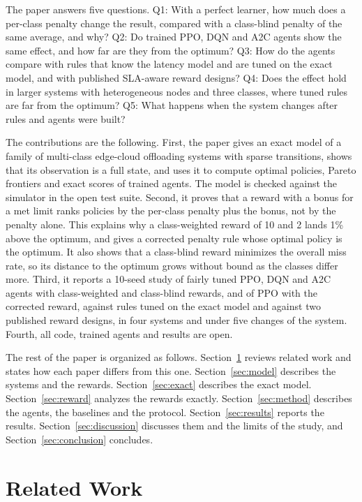 The paper answers five questions.
Q1: With a perfect learner, how much does a per-class penalty change the result, compared with a class-blind penalty of the same average, and why?
Q2: Do trained PPO, DQN and A2C agents show the same effect, and how far are they from the optimum?
Q3: How do the agents compare with rules that know the latency model and are tuned on the exact model, and with published SLA-aware reward designs?
Q4: Does the effect hold in larger systems with heterogeneous nodes and three classes, where tuned rules are far from the optimum?
Q5: What happens when the system changes after rules and agents were built?

The contributions are the following. First, the paper gives an exact model of a family of multi-class edge-cloud offloading systems with sparse transitions, shows that its observation is a full state, and uses it to compute optimal policies, Pareto frontiers and exact scores of trained agents. The model is checked against the simulator in the open test suite. Second, it proves that a reward with a bonus for a met limit ranks policies by the per-class penalty plus the bonus, not by the penalty alone. This explains why a class-weighted reward of 10 and 2 lands 1\% above the optimum, and gives a corrected penalty rule whose optimal policy is the optimum. It also shows that a class-blind reward minimizes the overall miss rate, so its distance to the optimum grows without bound as the classes differ more. Third, it reports a 10-seed study of fairly tuned PPO, DQN and A2C agents with class-weighted and class-blind rewards, and of PPO with the corrected reward, against rules tuned on the exact model and against two published reward designs, in four systems and under five changes of the system. Fourth, all code, trained agents and results are open.

The rest of the paper is organized as follows. Section~\ref{sec:related} reviews related work and states how each paper differs from this one. Section~\ref{sec:model} describes the systems and the rewards. Section~\ref{sec:exact} describes the exact model. Section~\ref{sec:reward} analyzes the rewards exactly. Section~\ref{sec:method} describes the agents, the baselines and the protocol. Section~\ref{sec:results} reports the results. Section~\ref{sec:discussion} discusses them and the limits of the study, and Section~\ref{sec:conclusion} concludes.

\section{Related Work}
\label{sec:related}

